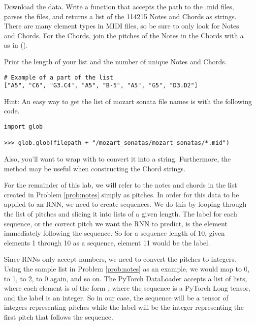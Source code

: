 \begin{problem}
Download the data.
Write a function that accepts the path to the .mid files, parses the files, and returns a list of the 114215 Notes and Chords as strings.
There are many element types in MIDI files, so be sure to only look for Notes and Chords.
For the Chords, join the pitches of the Notes in the Chords with a  as in ().

Print the length of your list and the number of unique Notes and Chords.

\begin{lstlisting}
# Example of a part of the list
["A5", "C6", "G3.C4", "A5", "B-5", "A5", "G5", "D3.D2"]
\end{lstlisting}
Hint: An easy way to get the list of mozart sonata file names is with the following code.
\begin{lstlisting}
import glob

>>> glob.glob(filepath + "/mozart_sonatas/mozart_sonatas/*.mid")
\end{lstlisting}
Also, you'll want to wrap  with  to convert it into a string.
Furthermore, the  method may be useful when constructing the Chord strings.

\label{prob:notes}
\end{problem}

For the remainder of this lab, we will refer to the notes and chords in the list created in Problem \ref{prob:notes} simply as pitches.
In order for this data to be applied to an RNN, we need to create sequences.
We do this by looping through the list of pitches and slicing it into lists of a given length.
The label for each sequence, or the correct pitch we want the RNN to predict, is the element immediately following the sequence.
So for a sequence length of 10, given elements 1 through 10 as a sequence, element 11 would be the label.

Since RNNs only accept numbers, we need to convert the pitches to integers.
Using the sample list in Problem \ref{prob:notes} as an example, we would map  to 0,  to 1,  to 2,  to 0 again, and so on.
The PyTorch DataLoader accepts a list of lists, where each element is of the form , where the sequence is a PyTorch Long tensor, and the label is an integer.
So in our case, the sequence will be a tensor of integers representing pitches while the label will be the integer representing the first pitch that follows the sequence.

